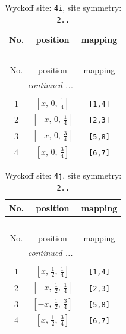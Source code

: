 \documentclass[fleqn,8pt]{jsarticle}
\begin{document}
\begin{longtable}{ccc}
\caption{Wyckoff site: {\tt 4i}, site symmetry: {\tt 2..}}
 \\
 \hline \hline
No. & position & mapping \\ \hline \endfirsthead

\multicolumn{2}{l}{\tablename\ \thetable{}} \\
 \hline \hline
No. & position & mapping \\ \hline \endhead

 \hline \hline
\multicolumn{2}{r}{\footnotesize\it continued ...} \\ \endfoot

 \hline \hline
\multicolumn{2}{r}{} \\ \endlastfoot

1 & $\left[ x,\, 0,\, \frac{1}{4} \right]$ & {\tt [1,4]} \\ \hline
2 & $\left[ - x,\, 0,\, \frac{1}{4} \right]$ & {\tt [2,3]} \\ \hline
3 & $\left[ - x,\, 0,\, \frac{3}{4} \right]$ & {\tt [5,8]} \\ \hline
4 & $\left[ x,\, 0,\, \frac{3}{4} \right]$ & {\tt [6,7]} \\
\end{longtable}
\renewcommand{\arraystretch}{1.2}
\begin{longtable}{ccc}
\caption{Wyckoff site: {\tt 4j}, site symmetry: {\tt 2..}}
 \\
 \hline \hline
No. & position & mapping \\ \hline \endfirsthead

\multicolumn{2}{l}{\tablename\ \thetable{}} \\
 \hline \hline
No. & position & mapping \\ \hline \endhead

 \hline \hline
\multicolumn{2}{r}{\footnotesize\it continued ...} \\ \endfoot

 \hline \hline
\multicolumn{2}{r}{} \\ \endlastfoot

1 & $\left[ x,\, \frac{1}{2},\, \frac{1}{4} \right]$ & {\tt [1,4]} \\ \hline
2 & $\left[ - x,\, \frac{1}{2},\, \frac{1}{4} \right]$ & {\tt [2,3]} \\ \hline
3 & $\left[ - x,\, \frac{1}{2},\, \frac{3}{4} \right]$ & {\tt [5,8]} \\ \hline
4 & $\left[ x,\, \frac{1}{2},\, \frac{3}{4} \right]$ & {\tt [6,7]} \\
\end{longtable}
\end{document}
